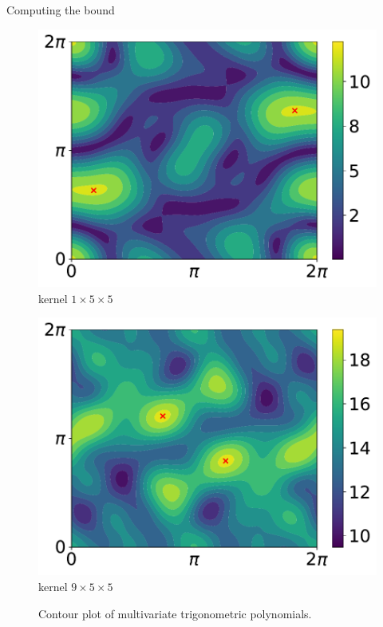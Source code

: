 \begin{frame}{Computing the bound}
\begin{figure}[ht]
\begin{minipage}{.22\linewidth}
    \end{minipage}
    \begin{minipage}{.22\linewidth}
	\centering
	\includegraphics[scale=0.16]{images/contour_poly_200_1_1_5.pdf} \\ {\small kernel $1\times5\times5$}
    \end{minipage}
    \begin{minipage}{.22\linewidth}
	\centering
	\includegraphics[scale=0.16]{images/contour_poly_200_1_9_5.pdf} \\ {\small kernel $9\times5\times5$}
    \end{minipage}
    \caption{Contour plot of multivariate trigonometric polynomials.}
    \label{fig:contour_plot_trigonometric_polynomials}
  \end{figure}%


\end{frame}
